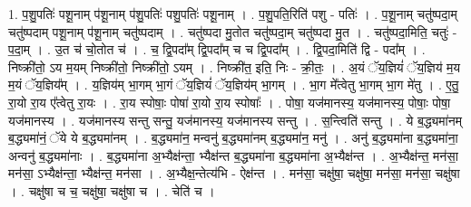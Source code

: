 \documentclass[17pt]{extarticle}
\begin{document}
1. प॒शु॒पतिः॑ पशू॒नाम् प॑शू॒नाम् प॑शु॒पतिः॑ पशु॒पतिः॑ पशू॒नाम् । . प॒शु॒पति॒रिति॑ पशु - पतिः॑ । . प॒शू॒नाम् चतु॑ष्पदा॒म् चतु॑ष्पदाम् पशू॒नाम् प॑शू॒नाम् चतु॑ष्पदाम् । . चतु॑ष्पदा मु॒तोत चतु॑ष्पदा॒म् चतु॑ष्पदा मु॒त । . चतु॑ष्पदा॒मिति॒ चतुः॑ - प॒दा॒म् । . उ॒त च॑ चो॒तोत च॑ । . च॒ द्वि॒पदा᳚म् द्वि॒पदा᳚म् च च द्वि॒पदा᳚म् । . द्वि॒पदा॒मिति॑ द्वि - पदा᳚म् । . निष्क्री॑तो॒ ऽय म॒यम् निष्क्री॑तो॒ निष्क्री॑तो॒ ऽयम् । . निष्क्री॑त॒ इति॒ निः - क्री॒तः॒ । . अ॒यं ॅय॒ज्ञियं॑ ॅय॒ज्ञिय॑ म॒य म॒यं ॅय॒ज्ञिय᳚म् । . य॒ज्ञिय॑म् भा॒गम् भा॒गं ॅय॒ज्ञियं॑ ॅय॒ज्ञिय॑म् भा॒गम् । . भा॒ग मे᳚त्वेतु भा॒गम् भा॒ग मे॑तु । . ए॒तु॒ रा॒यो रा॒य ए᳚त्वेतु रा॒यः । . रा॒य स्पोषाः॒ पोषा॑ रा॒यो रा॒य स्पोषाः᳚ । . पोषा॒ यज॑मानस्य॒ यज॑मानस्य॒ पोषाः॒ पोषा॒ यज॑मानस्य । . यज॑मानस्य सन्तु सन्तु॒ यज॑मानस्य॒ यज॑मानस्य सन्तु । . स॒न्त्विति॑ सन्तु । . ये ब॒द्ध्यमा॑नम् ब॒द्ध्यमा॑नं॒ ॅये ये ब॒द्ध्यमा॑नम् । . ब॒द्ध्यमा॑न॒ मन्वनु॑ ब॒द्ध्यमा॑नम् ब॒द्ध्यमा॑न॒ मनु॑ । . अनु॑ ब॒द्ध्यमा॑ना ब॒द्ध्यमा॑ना॒ अन्वनु॑ ब॒द्ध्यमा॑नाः । . ब॒द्ध्यमा॑ना अ॒भ्यैक्ष॑न्ता॒ भ्यैक्ष॑न्त ब॒द्ध्यमा॑ना ब॒द्ध्यमा॑ना अ॒भ्यैक्ष॑न्त । . अ॒भ्यैक्ष॑न्त॒ मन॑सा॒ मन॑सा॒ ऽभ्यैक्ष॑न्ता॒ भ्यैक्ष॑न्त॒ मन॑सा । . अ॒भ्यैक्ष॒न्तेत्य॑भि - ऐक्ष॑न्त । . मन॑सा॒ चक्षु॑षा॒ चक्षु॑षा॒ मन॑सा॒ मन॑सा॒ चक्षु॑षा । . चक्षु॑षा च च॒ चक्षु॑षा॒ चक्षु॑षा च । . चेति॑ च । \newline
\end{document}
